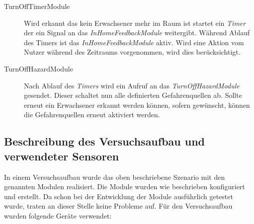 \begin{description}
\item [TurnOffTimerModule] Wird erkannt das kein Erwachsener mehr im Raum ist startet ein \emph{Timer} der ein Signal an das \emph{InHomeFeedbackModule} weitergibt. Während Ablauf des Timers ist das \emph{InHomeFeedbackModule} aktiv. Wird eine Aktion vom Nutzer während des Zeitraums vorgenommen, wird dies berücksichtigt.

\item [TurnOffHazardModule] Nach Ablauf des \emph{Timers} wird ein Aufruf an das \emph{TurnOffHazardModule} gesendet. Dieser schaltet nun alle definierten Gefahrenquellen ab. Sollte erneut ein Erwachsener erkannt werden können, sofern gewünscht, können die Gefahrenquellen erneut aktiviert werden.
\end{description}


\subsection{Beschreibung des Versuchsaufbau und verwendeter Sensoren}
In einem Versuchsaufbau wurde das oben beschriebene Szenario mit den genannten Modulen realisiert. Die Module wurden wie beschrieben konfiguriert und erstellt. Da schon bei der Entwicklung der Module ausführlich getestet wurde, traten an dieser Stelle keine Probleme auf.
Für den Versuchsaufbau wurden folgende Geräte verwendet:

